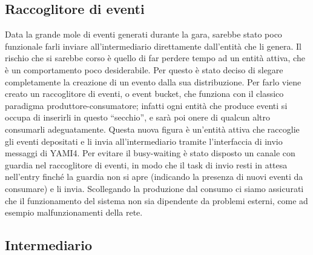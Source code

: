 \subsection{Raccoglitore di eventi}

Data la grande mole di eventi generati durante la gara, sarebbe stato poco funzionale farli inviare all’intermediario direttamente dall’entità che li genera. Il rischio che si sarebbe corso è quello di far perdere tempo ad un entità attiva, che è un comportamento poco desiderabile. Per questo è stato deciso di slegare completamente la creazione di un evento dalla sua distribuzione. Per farlo viene creato un raccoglitore di eventi, o event bucket, che funziona con il classico paradigma produttore-consumatore; infatti ogni entità che produce eventi si occupa di inserirli in questo “secchio”, e sarà poi onere di qualcun altro consumarli adeguatamente.
Questa nuova figura è un’entità attiva che raccoglie gli eventi depositati e li invia all’intermediario tramite l’interfaccia di invio messaggi di YAMI4. Per evitare il busy-waiting è stato disposto un canale con guardia nel raccoglitore di eventi, in modo che il task di invio resti in attesa nell’entry finché la guardia non si apre (indicando la presenza di nuovi eventi da consumare) e li invia.
Scollegando la produzione dal consumo ci siamo assicurati che il funzionamento del sistema non sia dipendente da problemi esterni, come ad esempio malfunzionamenti della rete.

\subsection{Intermediario}

